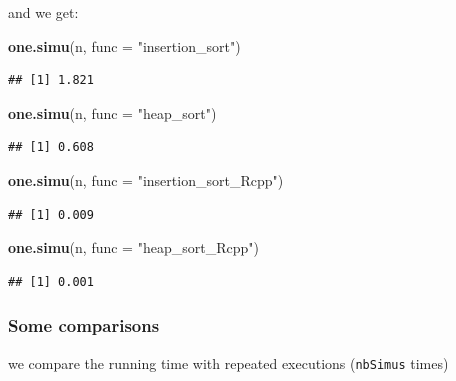 \documentclass[
]{article}
\newenvironment{Shaded}{\begin{snugshade}}{\end{snugshade}}
\newcommand{\AttributeTok}[1]{\textcolor[rgb]{0.13,0.29,0.53}{#1}}
\newcommand{\FunctionTok}[1]{\textcolor[rgb]{0.13,0.29,0.53}{\textbf{#1}}}
\newcommand{\NormalTok}[1]{#1}
\newcommand{\StringTok}[1]{\textcolor[rgb]{0.31,0.60,0.02}{#1}}
\begin{document}
and we get:

\begin{Shaded}
\begin{Highlighting}[]
\FunctionTok{one.simu}\NormalTok{(n, }\AttributeTok{func =} \StringTok{"insertion\_sort"}\NormalTok{)}
\end{Highlighting}
\end{Shaded}

\begin{verbatim}
## [1] 1.821
\end{verbatim}

\begin{Shaded}
\begin{Highlighting}[]
\FunctionTok{one.simu}\NormalTok{(n, }\AttributeTok{func =} \StringTok{"heap\_sort"}\NormalTok{)}
\end{Highlighting}
\end{Shaded}

\begin{verbatim}
## [1] 0.608
\end{verbatim}

\begin{Shaded}
\begin{Highlighting}[]
\FunctionTok{one.simu}\NormalTok{(n, }\AttributeTok{func =} \StringTok{"insertion\_sort\_Rcpp"}\NormalTok{)}
\end{Highlighting}
\end{Shaded}

\begin{verbatim}
## [1] 0.009
\end{verbatim}

\begin{Shaded}
\begin{Highlighting}[]
\FunctionTok{one.simu}\NormalTok{(n, }\AttributeTok{func =} \StringTok{"heap\_sort\_Rcpp"}\NormalTok{)}
\end{Highlighting}
\end{Shaded}

\begin{verbatim}
## [1] 0.001
\end{verbatim}

\subsubsection{Some comparisons}\label{some-comparisons}

we compare the running time with repeated executions (\texttt{nbSimus}
times)
\end{document}
